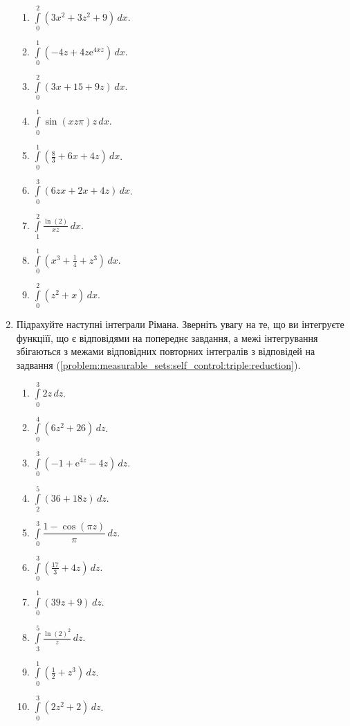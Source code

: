 \begin{enumerate}
\begin{multicols}{2}
\begin{enumerate}[label*=\arabic*.]
        \item $\int\limits_0^2 \left(3 x^{2}+3 z^{2}+9\right) \,dx$.
        \item $\int\limits_0^1 \left(-4 z+4 z {\mathrm e}^{4 x z}\right) \,dx$.
        \item $\int\limits_0^2 \left(3 x+15+9 z\right) \,dx$.
        \item $\int\limits_0^1 {\sin}{\left(x z \pi \right)} {z} \,dx$.
        \item $\int\limits_0^1 \left(\frac{8}{3}+6 x+4 z\right) \,dx$.
        \item $\int\limits_0^3 \left(6 z x+2 x+4 z\right) \,dx$.
        \item $\int\limits_1^2 \frac{\ln\! \left(2\right)}{x z} \,dx$.
        \item $\int\limits_0^1 \left({x^{3}+\frac{1}{4}+z^{3}}\right) \,dx$.
        \item $\int\limits_0^2 \left(z^{2}+x\right) \,dx$.
    \end{enumerate}
\end{multicols}
\item\label{problem:measurable_sets:self_control:triple:outer} Підрахуйте наступні інтеграли Рімана. Зверніть увагу на те, що ви інтегруєте функціїї, що є відповідями на попереднє завдання, а межі інтегрування збігаються з межами відповідних повторних інтегралів з відповідей на задвання (\ref{problem:measurable_sets:self_control:triple:reduction}).
\begin{multicols}{2}
    \begin{enumerate}[label*=\arabic*.]
        \item $\int\limits_0^3 2z \,dz$.
        \item $\int\limits_0^4 \left({6} {z^{2}}{+}{26}\right) \,dz$.
        \item $\int\limits_0^3 \left(-1+{\mathrm e}^{4 z}-4z\right) \,dz$.
        \item $\int\limits_2^5 \left(36 + 18 z\right) \,dz$.
        \item $\int\limits_0^3 \dfrac{1 - \cos\! \left(\pi  z\right)}{\pi} \,dz$.
        \item $\int\limits_0^3\left(\frac{17}{3}+4 z\right) \,dz$.
        \item $\int\limits_0^1 \left({39} {z}{+}{9}\right) \,dz$.
        \item $\int\limits_3^5 \frac{\ln\! \left(2\right)^{2}}{z} \,dz$.
        \item $\int\limits_0^1 \left(\frac{1}{2}+z^{3}\right) \,dz$.
        \item $\int\limits_0^3 \left({2} {z^{2}}{+}{2}\right) \,dz$.
    \end{enumerate}
\end{multicols}
\end{enumerate}
